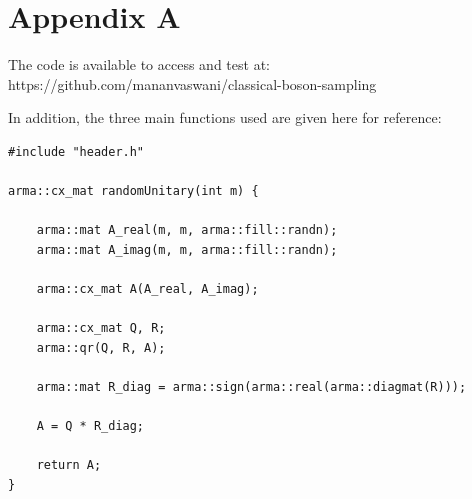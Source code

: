 \documentclass[ %
                    author={Manan Vaswani},
                supervisor={Dr. Raphael Clifford},
                    degree={MEng},
                     title={A multi-core CPU implementation of the classical Boson Sampling algorithm},
                  subtitle={},
                      type={},
                      year={2019} ]{dissertation}
\theoremstyle{plain}
\theoremstyle{definition}
\begin{document}
%
%

\backmatter





\appendix

\chapter{Appendix A}
\label{app:code}
The code is available to access and test at: https://github.com/mananvaswani/classical-boson-sampling

In addition, the three main functions used are given here for reference:
\begin{verbatim}
#include "header.h"

arma::cx_mat randomUnitary(int m) {

    arma::mat A_real(m, m, arma::fill::randn);
    arma::mat A_imag(m, m, arma::fill::randn);

    arma::cx_mat A(A_real, A_imag);

    arma::cx_mat Q, R;
    arma::qr(Q, R, A);

    arma::mat R_diag = arma::sign(arma::real(arma::diagmat(R)));

    A = Q * R_diag;

    return A;
}
\end{verbatim}
\end{document}
